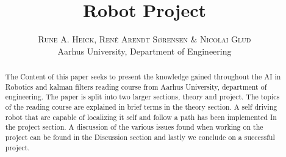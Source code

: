 


\title{\vspace{-15mm}\fontsize{24pt}{10pt}\selectfont\textbf{Robot Project}} %

\author{
\large
\textsc{Rune A. Heick, René Arendt Sørensen \& Nicolai Glud}\\[2mm] %
\normalsize Aarhus University, Department of Engineering \\ %
\vspace{-5mm}
}
\date{}



\setlength{\abovedisplayskip}{1cm}
\setlength{\belowdisplayskip}{.8cm}
\maketitle %

\newpage

\begin{abstract}
The Content of this paper seeks to present the knowledge gained throughout the AI in Robotics and kalman filters reading course from Aarhus University, department of engineering. The paper is split into two larger sections,  theory and project. The topics of the reading course are explained in brief terms in the theory section.  A self driving robot that are capable of localizing it self and follow a path has been implemented In the project section. A discussion of the various issues found when working on the project can be found in the Discussion section and lastly we conclude on a successful project.
\end{abstract}
\tableofcontents



